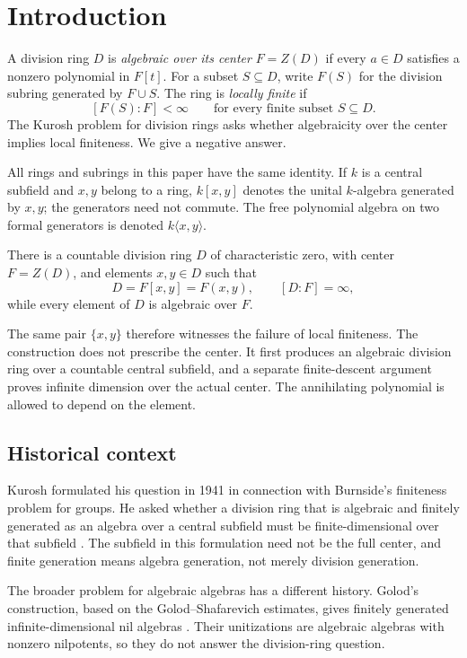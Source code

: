 \section{Introduction}\label{sec:introduction}

A division ring $D$ is \emph{algebraic over its center} $F=Z(D)$ if every
$a\in D$ satisfies a nonzero polynomial in $F[t]$. For a subset $S\subseteq D$,
write $F(S)$ for the division subring generated by $F\cup S$.
The ring is \emph{locally finite} if
\[
 [F(S):F]<\infty\qquad\text{for every finite subset }S\subseteq D.
\]
The Kurosh problem for division rings asks whether algebraicity over the
center implies local finiteness. We give a negative answer.

All rings and subrings in this paper have the same identity. If $k$ is a
central subfield and $x,y$ belong to a ring, $k[x,y]$ denotes the unital
$k$-algebra generated by $x,y$; the generators need not commute.
The free polynomial algebra on two formal generators is denoted
$k\langle x,y\rangle$.

\begin{theorem}\label{thm:main}
There is a countable division ring $D$ of characteristic zero, with
center $F=Z(D)$, and elements $x,y\in D$ such that
\[
 D=F[x,y]=F(x,y),\qquad [D:F]=\infty,
\]
while every element of $D$ is algebraic over $F$.
\end{theorem}

The same pair $\{x,y\}$ therefore witnesses the failure of local finiteness.
The construction does not prescribe the center. It first produces an
algebraic division ring over a countable central subfield, and a separate
finite-descent argument proves infinite dimension over the actual center.
The annihilating polynomial is allowed to depend on the element.

\subsection{Historical context}

Kurosh formulated his question in 1941 in connection with Burnside's
finiteness problem for groups. He asked whether a division ring that is
algebraic and finitely generated as an algebra over a central subfield
must be finite-dimensional over that subfield
\cite[Problem~(K), p.~240]{Kurosh1941}. The subfield in this formulation
need not be the full center, and finite generation means algebra
generation, not merely division generation.

The broader problem for algebraic algebras has a different history.
Golod's construction, based on the Golod--Shafarevich estimates, gives
finitely generated infinite-dimensional nil algebras
\cite[Example~1]{Golod1964}. Their unitizations are algebraic algebras
with nonzero nilpotents, so they do not answer the division-ring question.

